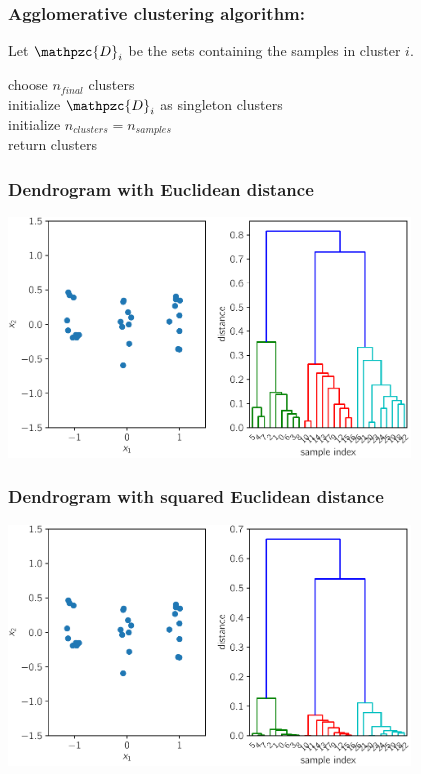 \documentclass[Nike]{tuberlinbeamer}
\begin{document}
\begin{frame}
  \frametitle{Agglomerative clustering algorithm:}
  Let $\mathpzc{D}_i$ be the sets containing the samples in cluster $i$.  \\
  \bigskip

  choose $n_{final}$ clusters\\
  initialize $\mathpzc{D}_i$ as singleton clusters\\
  initialize $n_{clusters} = n_{samples}$\\
  return clusters
\end{frame}

\begin{frame}
  \frametitle{Dendrogram with Euclidean distance}
  \begin{center}
    \centering\includegraphics[width=0.8\textwidth]{dendrogram_euclidean.pdf}
  \end{center}
\end{frame}

\begin{frame}
  \frametitle{Dendrogram with squared Euclidean distance}
  \begin{center}
    \centering\includegraphics[width=0.8\textwidth]{dendrogram_squared_euclidean.pdf}
  \end{center}
\end{frame}
\end{document}
